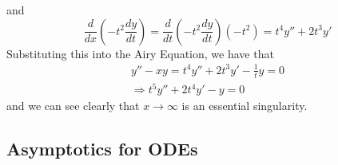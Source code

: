 \documentclass{article}
\newcommand{\od}[2]{\frac{d #1}{d #2}}
\begin{document}
and 
\begin{equation*}
    \od{}{x}\left(-t^2 \od{y}{t}\right) = \od{}{t}\left(-t^2\od{y}{t}\right)(-t^2) = t^4y''+2t^3y'
\end{equation*}
Substituting this into the Airy Equation, we have that 
\begin{equation*}
    \begin{split}
        y''-xy=t^4y''+2t^3y'-\frac{1}{t}y=0\\
        \Rightarrow t^5y''+2t^4y'-y=0
    \end{split}
\end{equation*}
and we can see clearly that $x\rightarrow \infty$ is an essential singularity. 
\subsection{Asymptotics for ODEs}
\end{document}
